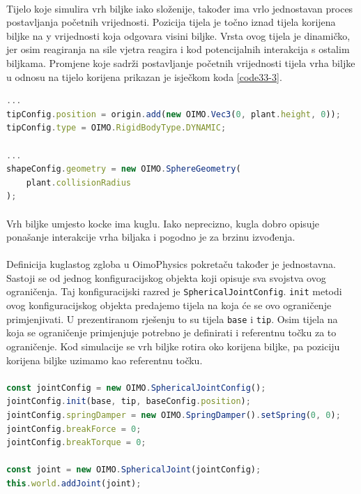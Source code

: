 \documentclass[times, utf8, diplomski]{fer}
\begin{document}
\paragraph{}
Tijelo koje simulira vrh biljke iako složenije, također ima vrlo jednostavan proces 
postavljanja početnih vrijednosti. Pozicija tijela je točno iznad tijela korijena biljke na
y vrijednosti koja odgovara visini biljke. Vrsta ovog tijela je dinamičko, jer osim 
reagiranja na sile vjetra reagira i kod potencijalnih interakcija s ostalim biljkama. 
Promjene koje sadrži postavljanje početnih vrijednosti tijela vrha biljke u odnosu na tijelo 
korijena prikazan je isječkom koda \ref{code33-3}.

\begin{lstlisting}[language=Javascript,label=code33-3,caption=Postavljanje tijela vrha biljke]
...
tipConfig.position = origin.add(new OIMO.Vec3(0, plant.height, 0));
tipConfig.type = OIMO.RigidBodyType.DYNAMIC;

...
shapeConfig.geometry = new OIMO.SphereGeometry(
	plant.collisionRadius
);
\end{lstlisting}

\paragraph{}
Vrh biljke umjesto kocke ima kuglu. Iako neprecizno, kugla dobro opisuje ponašanje 	
interakcije vrha biljaka i pogodno je za brzinu izvođenja.

\paragraph{}
Definicija kuglastog zgloba u OimoPhysics pokretaču također je jednostavna. Sastoji se od
jednog konfiguracijskog objekta koji opisuje sva svojstva ovog ograničenja.
Taj konfiguracijski razred je \verb#SphericalJointConfig#. \verb#init# metodi ovog 
konfiguracijskog objekta predajemo tijela na koja će se ovo ograničenje primjenjivati. U 
prezentiranom rješenju to su tijela \verb#base# i \verb#tip#. Osim tijela na koja se 
ograničenje primjenjuje potrebno je definirati i referentnu točku za to ograničenje. Kod 
simulacije se vrh biljke rotira oko korijena biljke, pa poziciju korijena biljke uzimamo kao 
referentnu točku.
\paragraph{}

\begin{lstlisting}[language=Javascript,label=code33-4,caption=Postavljanje kuglastog zgloba]
const jointConfig = new OIMO.SphericalJointConfig();
jointConfig.init(base, tip, baseConfig.position);
jointConfig.springDamper = new OIMO.SpringDamper().setSpring(0, 0);
jointConfig.breakForce = 0;
jointConfig.breakTorque = 0;

const joint = new OIMO.SphericalJoint(jointConfig);
this.world.addJoint(joint);
\end{lstlisting}
\end{document}

